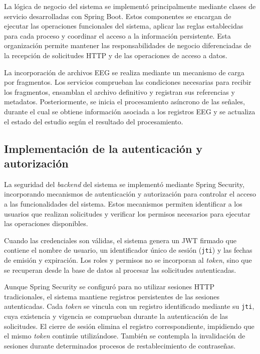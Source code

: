 La lógica de negocio del sistema se implementó
principalmente mediante clases de servicio
desarrolladas con Spring Boot. Estos componentes
se encargan de ejecutar las operaciones
funcionales del sistema, aplicar las reglas
establecidas para cada proceso y coordinar
el acceso a la información persistente.
Esta organización permite mantener las
responsabilidades de negocio diferenciadas
de la recepción de solicitudes HTTP y de
las operaciones de acceso a datos.

La incorporación de archivos EEG se realiza
mediante un mecanismo de carga por fragmentos.
Los servicios comprueban las condiciones
necesarias para recibir los fragmentos,
ensamblan el archivo definitivo y registran
sus referencias y metadatos. Posteriormente,
se inicia el procesamiento asíncrono de
las señales, durante el cual se obtiene
información asociada a los registros EEG
y se actualiza el estado del estudio
según el resultado del procesamiento.

\subsection{Implementación de la autenticación y autorización}

La seguridad del \textit{backend} del sistema se implementó mediante
Spring Security, incorporando mecanismos de autenticación
y autorización para controlar el acceso a las funcionalidades
del sistema. Estos mecanismos permiten identificar a los
usuarios que realizan solicitudes y verificar los permisos
necesarios para ejecutar las operaciones disponibles.

Cuando las credenciales son válidas, el sistema genera un
JWT firmado que contiene el nombre de usuario, un
identificador único de sesión (\texttt{jti}) y las fechas
de emisión y expiración. Los roles y permisos no se
incorporan al \textit{token}, sino que se recuperan desde la base
de datos al procesar las solicitudes autenticadas.

Aunque Spring Security se configuró para no utilizar
sesiones HTTP tradicionales, el sistema mantiene registros
persistentes de las sesiones autenticadas. Cada \textit{token}
se vincula con un registro identificado mediante su
\texttt{jti}, cuya existencia y vigencia se comprueban
durante la autenticación de las solicitudes. El cierre
de sesión elimina el registro correspondiente, impidiendo
que el mismo \textit{token} continúe utilizándose. También se
contempla la invalidación de sesiones durante determinados
procesos de restablecimiento de contraseñas.

